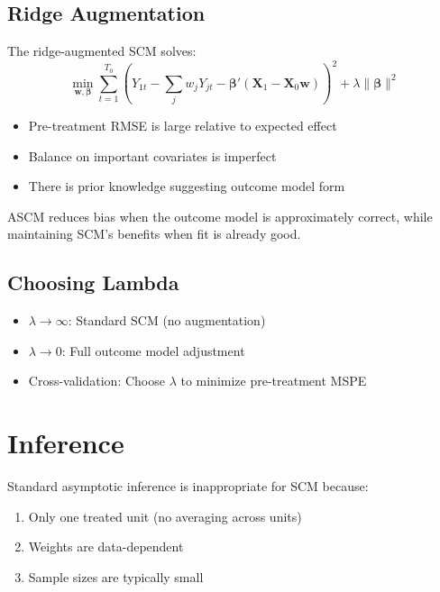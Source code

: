 \subsection{Ridge Augmentation}

The ridge-augmented SCM solves:
\begin{equation}
    \min_{\mathbf{w}, \boldsymbol{\beta}} \sum_{t=1}^{T_0} \left(Y_{1t} - \sum_j w_j Y_{jt} - \boldsymbol{\beta}'(\mathbf{X}_1 - \mathbf{X}_0\mathbf{w})\right)^2 + \lambda \|\boldsymbol{\beta}\|^2
\end{equation}

\begin{remark}
\begin{itemize}
    \item Pre-treatment RMSE is large relative to expected effect
    \item Balance on important covariates is imperfect
    \item There is prior knowledge suggesting outcome model form
\end{itemize}
ASCM reduces bias when the outcome model is approximately correct, while maintaining SCM's benefits when fit is already good.
\end{remark}

\subsection{Choosing Lambda}

\begin{itemize}
    \item $\lambda \to \infty$: Standard SCM (no augmentation)
    \item $\lambda \to 0$: Full outcome model adjustment
    \item Cross-validation: Choose $\lambda$ to minimize pre-treatment MSPE
\end{itemize}

\section{Inference}
\label{sec:scm_inference}

Standard asymptotic inference is inappropriate for SCM because:
\begin{enumerate}
    \item Only one treated unit (no averaging across units)
    \item Weights are data-dependent
    \item Sample sizes are typically small
\end{enumerate}

